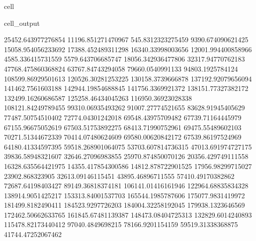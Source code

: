 \documentclass[letterpaper,10pt,english]{jupyterBook}
\begin{document}
\begin{sphinxuseclass}{cell}
\begin{sphinxVerbatimOutput}
\begin{sphinxuseclass}{cell_output}
\begin{sphinxVerbatim}[commandchars=\\\{\}]
25452.643977276854  11196.851271470967  \PYGZhy{}545.8312323275459  \PYGZhy{}9390.674090621425  \PYGZhy{}15058.954056233692  \PYGZhy{}17388.452489311298  \PYGZhy{}16340.33998003656  \PYGZhy{}12001.994400858966  \PYGZhy{}4585.336415731559  5579.643706685747  18056.342936477806  32317.94770762183  47768.475860368824  63767.84743294058  79660.0540991133  94803.1925784124  108599.86929501613  120526.30281253225  130158.3739666878  137192.92079656094  141462.7561603188  142944.19854688845  141756.3369921372  138151.77327382172  132499.16260686587  125258.46434045263  116950.36923028338  108121.84249789455  99310.06935493262  91007.27774521655  83628.91945405629  77487.50754510402  72774.04301242018  69548.43975709482  67739.71164445979  67155.96675052619  67503.51753892275  68413.71990752961  69475.55489602103  70271.51344672339  70414.07480624609  69580.00620842172  67539.86197524969  64180.41334597395  59518.268901064075  53703.607814736315  47013.691974727175  39836.58948321607  32646.27096983855  25970.874850070126  20356.429749111558  16328.635564421975  14355.417854300586  14812.878722901525  17956.98299715027  23902.868323905  32613.09146115451  43895.46896711555  57410.49170382862  72687.64198403427  89149.36818374181  106141.01416161946  122964.68835834328  138914.9051425217  153313.84001537703  165544.1985787606  175077.9831419972  181499.8182490411  184523.9297726203  184004.32258192045  179938.1323646569  172462.50662633765  161845.67481139387  148473.08404725313  132829.6014240893  115478.82173440412  97040.4849698215  78166.9201154159  59519.31338368875  41744.47252067462  

\end{sphinxVerbatim}
\end{sphinxuseclass}
\end{sphinxVerbatimOutput}
\end{sphinxuseclass}
\end{document}
